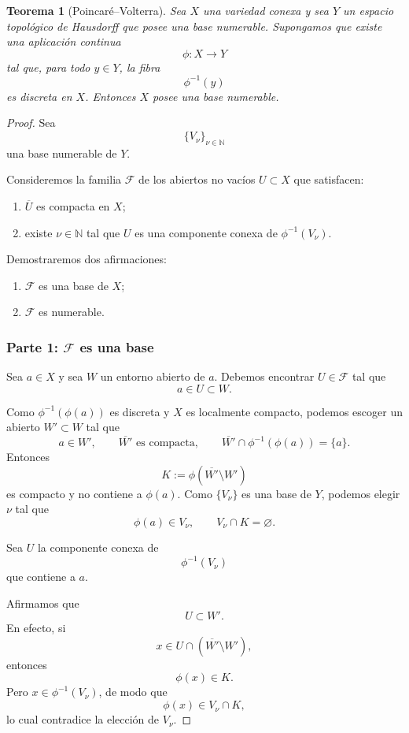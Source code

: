 \documentclass[11pt,a4paper]{article}
\theoremstyle{definition}
\theoremstyle{plain}
\newtheorem{teorema}{Teorema}[section]
\theoremstyle{remark}
\newcommand{\N}{\mathbb N}
\begin{document}
\begin{teorema}[Poincaré--Volterra]
Sea $X$ una variedad conexa y sea $Y$ un espacio topológico de Hausdorff
que posee una base numerable. Supongamos que existe una aplicación
continua
\[
\phi:X\longrightarrow Y
\]
tal que, para todo $y\in Y$, la fibra
\[
\phi^{-1}(y)
\]
es discreta en $X$. Entonces $X$ posee una base numerable.
\end{teorema}

\begin{proof}
Sea
\[
\{V_\nu\}_{\nu\in\N}
\]
una base numerable de $Y$.

Consideremos la familia $\mathcal F$ de los abiertos no vacíos
$U\subset X$ que satisfacen:

\begin{enumerate}[label=(\roman*)]
    \item $\overline U$ es compacta en $X$;
    \item existe $\nu\in\N$ tal que $U$ es una componente conexa de
    $\phi^{-1}(V_\nu)$.
\end{enumerate}

Demostraremos dos afirmaciones:

\begin{enumerate}[label=\textbf{Parte \arabic*.}]
    \item $\mathcal F$ es una base de $X$;
    \item $\mathcal F$ es numerable.
\end{enumerate}

\subsubsection*{Parte 1: $\mathcal F$ es una base}

Sea $a\in X$ y sea $W$ un entorno abierto de $a$. Debemos encontrar
$U\in\mathcal F$ tal que
\[
a\in U\subset W.
\]

Como $\phi^{-1}(\phi(a))$ es discreta y $X$ es localmente compacto,
podemos escoger un abierto $W'\subset W$ tal que
\[
a\in W',
\qquad
\overline{W'}\text{ es compacta},
\qquad
\overline{W'}\cap\phi^{-1}(\phi(a))=\{a\}.
\]
Entonces
\[
K:=\phi(\overline{W'}\setminus W')
\]
es compacto y no contiene a $\phi(a)$. Como $\{V_\nu\}$ es una base de
$Y$, podemos elegir $\nu$ tal que
\[
\phi(a)\in V_\nu,
\qquad
V_\nu\cap K=\varnothing.
\]

Sea $U$ la componente conexa de
\[
\phi^{-1}(V_\nu)
\]
que contiene a $a$.

Afirmamos que
\[
U\subset W'.
\]
En efecto, si
\[
x\in U\cap(\overline{W'}\setminus W'),
\]
entonces
\[
\phi(x)\in K.
\]
Pero $x\in\phi^{-1}(V_\nu)$, de modo que
\[
\phi(x)\in V_\nu\cap K,
\]
lo cual contradice la elección de $V_\nu$.


\end{proof}
\end{document}
